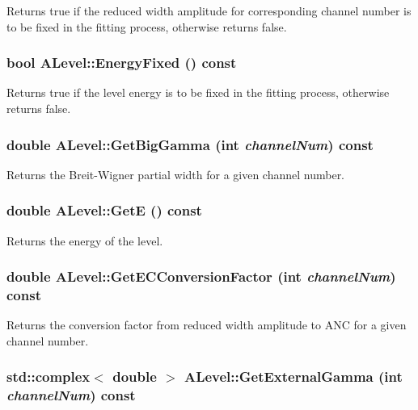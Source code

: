 Returns true if the reduced width amplitude for corresponding channel number is to be fixed in the fitting process, otherwise returns false. 
\subsubsection{\setlength{\rightskip}{0pt plus 5cm}bool ALevel::Energy\-Fixed () const}\label{classALevel_ab127808b9f980219acb20963b8ed0b3}


Returns true if the level energy is to be fixed in the fitting process, otherwise returns false. 
\subsubsection{\setlength{\rightskip}{0pt plus 5cm}double ALevel::Get\-Big\-Gamma (int {\em channel\-Num}) const}\label{classALevel_2f21c67d6773bc665e4203d53013631a}


Returns the Breit-Wigner partial width for a given channel number. 
\subsubsection{\setlength{\rightskip}{0pt plus 5cm}double ALevel::Get\-E () const}\label{classALevel_aa22d7e25798d04d69bab208d3c4e7e4}


Returns the energy of the level. 
\subsubsection{\setlength{\rightskip}{0pt plus 5cm}double ALevel::Get\-ECConversion\-Factor (int {\em channel\-Num}) const}\label{classALevel_4d41dd96f513eb5c7232da5077d50995}


Returns the conversion factor from reduced width amplitude to ANC for a given channel number. 
\subsubsection{\setlength{\rightskip}{0pt plus 5cm}std::complex$<$ double $>$ ALevel::Get\-External\-Gamma (int {\em channel\-Num}) const}\label{classALevel_4f3b10f52fcfc9f4f3c8abcb2a396a60}


